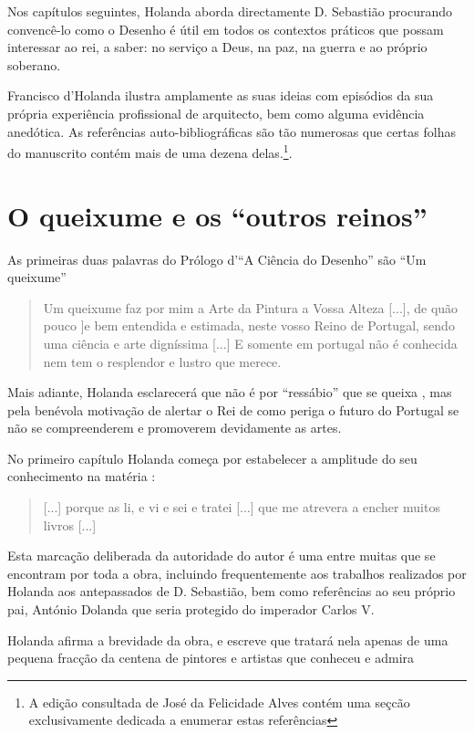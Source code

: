 \documentclass{article}
\begin{document}
Nos capítulos seguintes, Holanda aborda directamente D. Sebastião
procurando convencê-lo como o Desenho é útil em todos os contextos
práticos que possam interessar ao rei, a saber: no serviço a Deus, na
paz, na guerra e ao próprio soberano.

Francisco d'Holanda ilustra amplamente as suas ideias com episódios da
sua própria experiência profissional de arquitecto, bem como alguma
evidência anedótica. As referências auto-bibliográficas são tão
numerosas que certas folhas do manuscrito contém mais de uma dezena
delas.\footnote{A edição consultada de José da Felicidade Alves contém
  uma seçcão exclusivamente dedicada a enumerar estas referências}.

\section{O queixume e os ``outros reinos''}

As primeiras duas palavras do Prólogo d'``A Ciência do Desenho'' são
``Um queixume'' \cite[fl.34r]{holanda}

\begin{quote}
  Um queixume faz por mim a Arte da Pintura a Vossa Alteza [...], de
  quão pouco ]e bem entendida e estimada, neste vosso Reino de
    Portugal, sendo uma ciência e arte digníssima [...] E somente em
    portugal não é conhecida nem tem o resplendor e lustro que merece.
\end{quote}

Mais adiante, Holanda esclarecerá que não é por ``ressábio'' que se
queixa \cite[fl.36v]{holanda}, mas pela benévola motivação de alertar
o Rei de como periga o futuro do Portugal se não se compreenderem e
promoverem devidamente as artes.

No primeiro capítulo Holanda começa por estabelecer a amplitude do seu
conhecimento na matéria \cite[fl.34r]{holanda}:

\begin{quote}
  [...] porque as li, e vi e sei e tratei [...] que me atrevera a
  encher muitos livros [...]
\end{quote}

Esta marcação deliberada da autoridade do autor é uma entre muitas que
se encontram por toda a obra, incluindo frequentemente aos trabalhos
realizados por Holanda aos antepassados de D. Sebastião, bem como
referências ao seu próprio pai, António Dolanda que seria protegido do
imperador Carlos V.

Holanda afirma a brevidade da obra, e escreve que tratará nela apenas
de uma pequena fracção da centena de pintores e artistas que conheceu
e admira \cite[fl.34r]{holanda}
\end{document}
